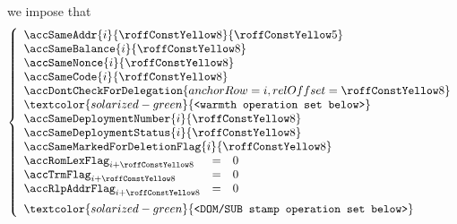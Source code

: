 \item[\underline{\underline{Second \delegateName{} account-row $n^°(i + \callSecondDelegateOrCalleeAccountRowOffset)$:}}]
	we impose that
	\[
		\left\{ \begin{array}{lcl}
			\multicolumn{3}{l}{\accSameAddr                   {i}{\callSecondDelegateOrCalleeAccountRowOffset}{\callFirstDelegateOrCalleeAccountRowOffset}} \\
			\multicolumn{3}{l}{\accSameBalance                {i}{\callSecondDelegateOrCalleeAccountRowOffset}} \\
			\multicolumn{3}{l}{\accSameNonce                  {i}{\callSecondDelegateOrCalleeAccountRowOffset}} \\
			\multicolumn{3}{l}{\accSameCode                   {i}{\callSecondDelegateOrCalleeAccountRowOffset}} \\
			\multicolumn{3}{l}{\accDontCheckForDelegation     { anchorRow = i, relOffset = \callSecondDelegateOrCalleeAccountRowOffset }} \\
			\multicolumn{3}{l}{\textcolor{solarized-green}    {\texttt{<warmth operation set below>}}} \\
			\multicolumn{3}{l}{\accSameDeploymentNumber       {i}{\callSecondDelegateOrCalleeAccountRowOffset}} \\
			\multicolumn{3}{l}{\accSameDeploymentStatus       {i}{\callSecondDelegateOrCalleeAccountRowOffset}} \\
			\multicolumn{3}{l}{\accSameMarkedForDeletionFlag  {i}{\callSecondDelegateOrCalleeAccountRowOffset}} \\
			\accRomLexFlag   _{i + \callSecondDelegateOrCalleeAccountRowOffset} & = & 0 \\
			\accTrmFlag      _{i + \callSecondDelegateOrCalleeAccountRowOffset} & = & 0 \\
			\accRlpAddrFlag  _{i + \callSecondDelegateOrCalleeAccountRowOffset} & = & 0 \vspace{2mm} \\
			\multicolumn{3}{l}{\textcolor{solarized-green}{\texttt{<DOM/SUB stamp operation set below>}}} \\
		\end{array} \right.
	\]
